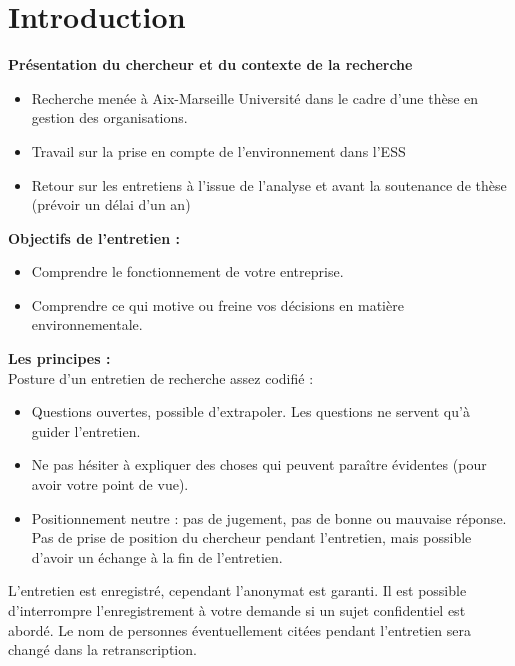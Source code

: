 \label{annexe:guide}
\section*{Introduction}
    \textbf{Présentation du chercheur et du contexte de la recherche}
    \begin{itemize}
        \item Recherche menée à Aix-Marseille Université dans le cadre d’une thèse en gestion des organisations.  
        \item Travail sur la prise en compte de l’environnement dans l’ESS
        \item Retour sur les entretiens à l’issue de l’analyse et avant la soutenance de thèse (prévoir un délai d’un an) \\
    \end{itemize}
    	
    \textbf{Objectifs de l’entretien : }
        \begin{itemize}
            \item Comprendre le fonctionnement de votre entreprise.
            \item Comprendre ce qui motive ou freine vos décisions en matière environnementale. \\
        \end{itemize}
        

    \textbf{Les principes : } \\
        Posture d’un entretien de recherche  assez codifié : 
            \begin{itemize}
                \item Questions ouvertes, possible d’extrapoler. Les questions ne servent qu’à guider l’entretien.
                \item Ne pas hésiter à expliquer des choses qui peuvent paraître évidentes (pour avoir votre point de vue).
                \item Positionnement neutre : pas de jugement, pas de bonne ou mauvaise réponse. Pas de prise de position du chercheur pendant l’entretien, mais possible d’avoir un échange à la fin de l’entretien.  \\
            \end{itemize}
        L’entretien est enregistré, cependant l’anonymat est garanti. Il est possible d’interrompre l’enregistrement à votre demande si un sujet confidentiel est abordé. Le nom de personnes éventuellement citées pendant l’entretien sera changé dans la retranscription.

